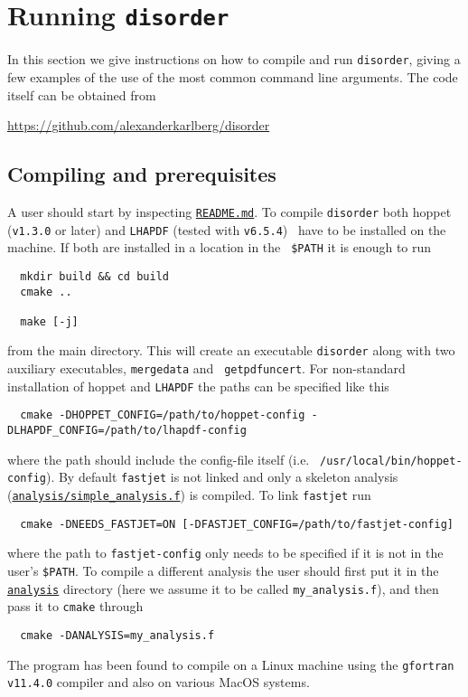 \documentclass[submission, PhysCodeb]{SciPost_better_arXiv}
\newcommand{\hoppet}{{\sc hoppet}}
\newcommand{\disorder}{{\tt disorder}}
\newcommand{\fastjet}{{\tt fastjet}}
\newcommand{\lhapdf}{{\tt LHAPDF}}
\newcommand{\ttt}[1]{\texttt{#1}}
\newcommand{\repolink}[2]{\href{https://github.com/alexanderkarlberg/disorder/blob/master/#1}{\ttt{#2}}}
\newcommand{\masterlink}[1]{\repolink{#1}{#1}}
\begin{document}
\section{Running \disorder{}}
\label{sec:running}
In this section we give instructions on how to compile and run
\disorder{}, giving a few examples of the use of the most common
command line arguments. The code itself can be obtained from

\begin{center}\url{https://github.com/alexanderkarlberg/disorder}\end{center}

\subsection{Compiling and prerequisites}
A user should start by inspecting \masterlink{README.md}. To compile
\disorder{} both \hoppet{} ({\tt v1.3.0} or later) and \lhapdf{}
(tested with {\tt v6.5.4})~\cite{Buckley:2014ana} have to be installed
on the machine. If both are installed in a location in the {\tt
  \$PATH} it is enough to run
\begin{lstlisting}
  mkdir build && cd build
  cmake ..

  make [-j]
\end{lstlisting}
from the main directory. This will create an executable \disorder{}
along with two auxiliary executables, {\tt mergedata} and {\tt
  getpdfuncert}. For non-standard installation of \hoppet{} and
\lhapdf{} the paths can be specified like this
\begin{lstlisting}
  cmake -DHOPPET_CONFIG=/path/to/hoppet-config -DLHAPDF_CONFIG=/path/to/lhapdf-config
\end{lstlisting}
where the path should include the config-file itself (i.e. {\tt
  /usr/local/bin/hoppet-config}). By default \fastjet{} is not linked
and only a skeleton analysis
(\masterlink{analysis/simple\_analysis.f}) is compiled. To link
\fastjet{} run
\begin{lstlisting}
  cmake -DNEEDS_FASTJET=ON [-DFASTJET_CONFIG=/path/to/fastjet-config]
\end{lstlisting}
where the path to {\tt fastjet-config} only needs to be specified if
it is not in the user's {\tt \$PATH}. To compile a different analysis
the user should first put it in the \masterlink{analysis} directory (here we
assume it to be called {\tt my\_analysis.f}), and then pass it to
{\tt cmake} through
\begin{lstlisting}
  cmake -DANALYSIS=my_analysis.f
\end{lstlisting}
The program has been found to compile on a Linux machine using the
{\tt gfortran v11.4.0} compiler and also on various MacOS systems.
\end{document}
